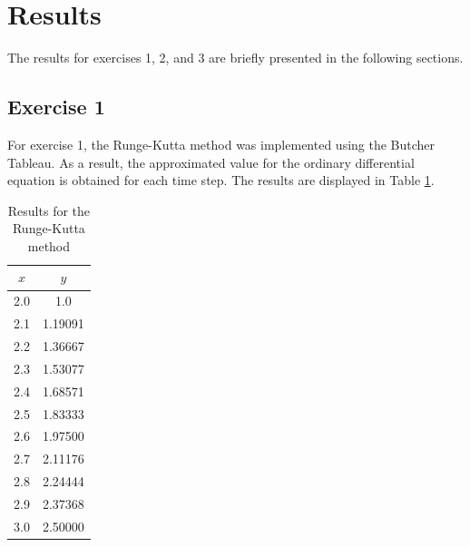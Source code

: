 \section{Results}\label{sec:results}
The results for exercises 1, 2, and 3 are briefly presented in the following sections.

\subsection{Exercise 1}\label{subsec:exercise_1}
For exercise 1, the Runge-Kutta method was implemented using the Butcher Tableau. As a result, the approximated value for the ordinary differential equation is obtained for each time step. The results are displayed in Table \ref{tab:results_ex1}.
\begin{table}[htb!]
    \centering
    \caption{Results for the Runge-Kutta method}
    \begin{tabular}{cc}
        \toprule
        $x$ & $y$ \\
        \midrule
        2.0 & 1.0 \\
        2.1 & 1.19091 \\
        2.2 & 1.36667 \\
        2.3 & 1.53077 \\
        2.4 & 1.68571 \\
        2.5 & 1.83333 \\
        2.6 & 1.97500 \\
        2.7 & 2.11176 \\
        2.8 & 2.24444 \\
        2.9 & 2.37368 \\
        3.0 & 2.50000 \\
        \bottomrule
    \end{tabular}
    \label{tab:results_ex1}
\end{table}

